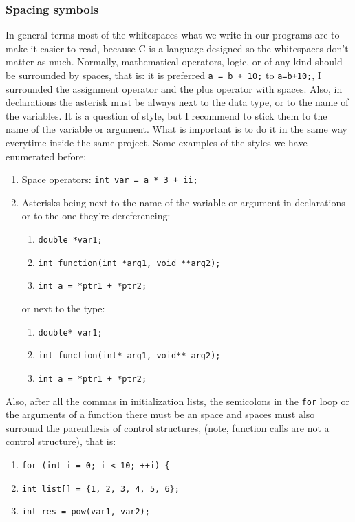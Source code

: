 \documentclass[a4paper]{article}
\begin{document}
\subsubsection{Spacing symbols}
In general terms most of the whitespaces what we write in our programs are to
make it easier to read, because C is a language designed so the whitespaces
don't matter as much. Normally, mathematical operators, logic, or of any kind
should be surrounded by spaces, that is: it is preferred
\lstinline[style=C]!a = b + 10;! to \lstinline[style=C]!a=b+10;!, I surrounded
the assignment operator and the plus operator with spaces. Also, in declarations
the asterisk must be always next to the data type, or to the name of the
variables. It is a question of style, but I recommend to stick them to the
name of the variable or argument. What is important is to do it in the same
way everytime inside the same project.
Some examples of the styles we have enumerated before:
\begin{enumerate}
    \item Space operators: \lstinline[style=C]!int var = a * 3 + ii;!
    \item Asterisks being next to the name of the variable or argument in
    declarations or to the one they're dereferencing:
    \begin{enumerate}
        \item \lstinline[style=C]!double *var1;!
        \item \lstinline[style=C]!int function(int *arg1, void **arg2);!
        \item \lstinline[style=C]!int a = *ptr1 + *ptr2;!
    \end{enumerate}
    or next to the type:
    \begin{enumerate}
        \item \lstinline[style=C]!double* var1;!
        \item \lstinline[style=C]!int function(int* arg1, void** arg2);!
        \item \lstinline[style=C]!int a = *ptr1 + *ptr2;!
    \end{enumerate}
\end{enumerate}

Also, after all the commas in initialization lists, the semicolons in the
\verb!for! loop or the arguments of a function there must be an space and spaces
must also surround the parenthesis of control structures, (note, function calls
are not a control structure), that is:
\begin{enumerate}
\item \lstinline[style=C]!for (int i = 0; i < 10; ++i)!\verb! {!
\item \lstinline[style=C]!int list[] = {1, 2, 3, 4, 5, 6};!
\item \lstinline[style=C]!int res = pow(var1, var2);!
\end{enumerate}
\end{document}
